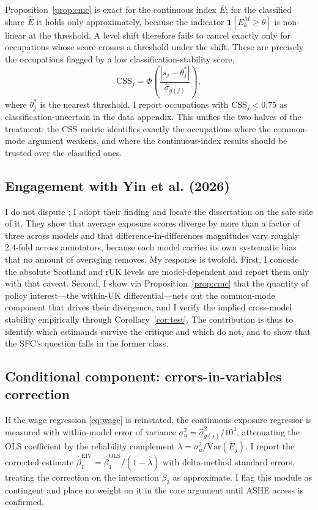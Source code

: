 Proposition~\ref{prop:cmc} is exact for the continuous index $\bar E$; for the classified share $\hat E$ it holds only approximately, because the indicator $\mathbf{1}[E^{M}_k\ge\theta]$ is non-linear at the threshold. A level shift therefore fails to cancel exactly only for occupations whose score crosses a threshold under the shift. These are precisely the occupations flagged by a low classification-stability score,
\begin{equation}
\mathrm{CSS}_j=\Phi\!\left(\frac{|s_j-\theta^{\ast}_j|}{\hat\sigma_{g(j)}}\right),
\end{equation}
where $\theta^{\ast}_j$ is the nearest threshold. I report occupations with $\mathrm{CSS}_j<0.75$ as classification-uncertain in the data appendix. This unifies the two halves of the treatment: the CSS metric identifies exactly the occupations where the common-mode argument weakens, and where the continuous-index results should be trusted over the classified ones.

\subsection{Engagement with Yin et al. (2026)}

I do not dispute \citet{yin2026}; I adopt their finding and locate the dissertation on the safe side of it. They show that average exposure scores diverge by more than a factor of three across models and that difference-in-differences magnitudes vary roughly 2.4-fold across annotators, because each model carries its own systematic bias that no amount of averaging removes. My response is twofold. First, I concede the absolute Scotland and rUK levels are model-dependent and report them only with that caveat. Second, I show via Proposition~\ref{prop:cmc} that the quantity of policy interest---the within-UK differential---nets out the common-mode component that drives their divergence, and I verify the implied cross-model stability empirically through Corollary~\ref{cor:test}. The contribution is thus to identify which estimands survive the \citet{yin2026} critique and which do not, and to show that the SFC's question falls in the former class.

\subsection{Conditional component: errors-in-variables correction}

If the wage regression \eqref{eq:wage} is reinstated, the continuous exposure regressor is measured with within-model error of variance $\sigma^2_u=\hat\sigma^2_{g(j)}/10^4$, attenuating the OLS coefficient by the reliability complement $\lambda=\sigma^2_u/\mathrm{Var}(E_j)$. I report the corrected estimate $\hat\beta^{\mathrm{EIV}}_1=\hat\beta^{\mathrm{OLS}}_1/(1-\hat\lambda)$ with delta-method standard errors, treating the correction on the interaction $\beta_3$ as approximate. I flag this module as contingent and place no weight on it in the core argument until ASHE access is confirmed.

